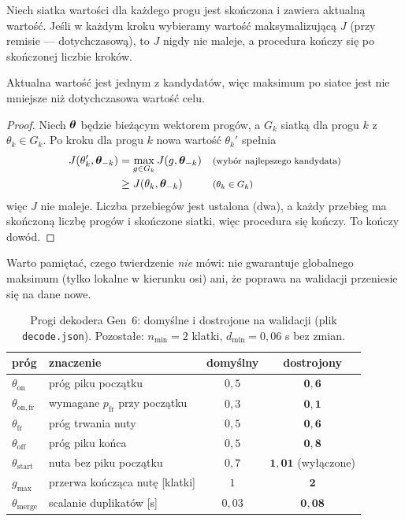 \begin{twierdzenie}\label{tw:wspolrzedne}
Niech siatka wartości dla każdego progu jest skończona i zawiera aktualną wartość. Jeśli w każdym kroku wybieramy wartość maksymalizującą $J$ (przy remisie --- dotychczasową), to $J$ nigdy nie maleje, a procedura kończy się po skończonej liczbie kroków.
\end{twierdzenie}
\begin{pomyslDowodu}
Aktualna wartość jest jednym z kandydatów, więc maksimum po siatce jest nie mniejsze niż dotychczasowa wartość celu.
\end{pomyslDowodu}
\begin{proof}
Niech $\bm{\theta}$ będzie bieżącym wektorem progów, a $G_k$ siatką dla progu $k$ z $\theta_k\in G_k$. Po kroku dla progu $k$ nowa wartość $\theta_k'$ spełnia
\begin{align*}
J(\theta_k',\bm{\theta}_{-k}) &= \max_{g\in G_k}J(g,\bm{\theta}_{-k}) && \text{\footnotesize (wybór najlepszego kandydata)}\\
 &\ge J(\theta_k,\bm{\theta}_{-k}) && \text{\footnotesize ($\theta_k\in G_k$)}
\end{align*}
więc $J$ nie maleje. Liczba przebiegów jest ustalona (dwa), a każdy przebieg ma skończoną liczbę progów i skończone siatki, więc procedura się kończy. To kończy dowód.
\end{proof}

Warto pamiętać, czego twierdzenie \emph{nie} mówi: nie gwarantuje globalnego maksimum (tylko lokalne w kierunku osi) ani, że poprawa na walidacji przeniesie się na dane nowe.

\begin{table}[ht]
\centering\small
\begin{tabular}{@{}llcc@{}}
\toprule
próg & znaczenie & domyślny & dostrojony\\
\midrule
$\theta_\mathrm{on}$ & próg piku początku & $0{,}5$ & $\mathbf{0{,}6}$\\
$\theta_\mathrm{on,fr}$ & wymagane $p_\mathrm{fr}$ przy początku & $0{,}3$ & $\mathbf{0{,}1}$\\
$\theta_\mathrm{fr}$ & próg trwania nuty & $0{,}5$ & $\mathbf{0{,}6}$\\
$\theta_\mathrm{off}$ & próg piku końca & $0{,}5$ & $\mathbf{0{,}8}$\\
$\theta_\mathrm{start}$ & nuta bez piku początku & $0{,}7$ & $\mathbf{1{,}01}$ (wyłączone)\\
$g_\mathrm{max}$ & przerwa kończąca nutę [klatki] & $1$ & $\mathbf{2}$\\
$\theta_\mathrm{merge}$ & scalanie duplikatów [s] & $0{,}03$ & $\mathbf{0{,}08}$\\
\bottomrule
\end{tabular}
\caption{Progi dekodera Gen~6: domyślne i dostrojone na walidacji (plik \texttt{decode.json}). Pozostałe: $n_\mathrm{min}=2$ klatki, $d_\mathrm{min}=0{,}06$ s bez zmian.}
\label{tab:progi}
\end{table}


